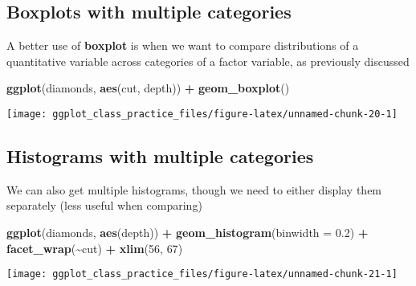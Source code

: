 \documentclass[
]{article}
\newenvironment{Shaded}{\begin{snugshade}}{\end{snugshade}}
\newcommand{\AttributeTok}[1]{\textcolor[rgb]{0.13,0.29,0.53}{#1}}
\newcommand{\DecValTok}[1]{\textcolor[rgb]{0.00,0.00,0.81}{#1}}
\newcommand{\FloatTok}[1]{\textcolor[rgb]{0.00,0.00,0.81}{#1}}
\newcommand{\FunctionTok}[1]{\textcolor[rgb]{0.13,0.29,0.53}{\textbf{#1}}}
\newcommand{\NormalTok}[1]{#1}
\newcommand{\SpecialCharTok}[1]{\textcolor[rgb]{0.81,0.36,0.00}{\textbf{#1}}}
\begin{document}
\hypertarget{boxplots-with-multiple-categories}{%
\subsection{Boxplots with multiple
categories}\label{boxplots-with-multiple-categories}}

A better use of \textbf{boxplot} is when we want to compare
distributions of a quantitative variable across categories of a factor
variable, as previously discussed

\begin{Shaded}
\begin{Highlighting}[]
\FunctionTok{ggplot}\NormalTok{(diamonds, }\FunctionTok{aes}\NormalTok{(cut, depth)) }\SpecialCharTok{+} \FunctionTok{geom\_boxplot}\NormalTok{()}
\end{Highlighting}
\end{Shaded}

\begin{center}\texttt{[image: ggplot\_class\_practice\_files/figure-latex/unnamed-chunk-20-1]} \end{center}

\hypertarget{histograms-with-multiple-categories}{%
\subsection{Histograms with multiple
categories}\label{histograms-with-multiple-categories}}

We can also get multiple histograms, though we need to either display
them separately (less useful when comparing)

\begin{Shaded}
\begin{Highlighting}[]
\FunctionTok{ggplot}\NormalTok{(diamonds, }\FunctionTok{aes}\NormalTok{(depth)) }\SpecialCharTok{+} \FunctionTok{geom\_histogram}\NormalTok{(}\AttributeTok{binwidth =} \FloatTok{0.2}\NormalTok{) }\SpecialCharTok{+} 
    \FunctionTok{facet\_wrap}\NormalTok{(}\SpecialCharTok{\textasciitilde{}}\NormalTok{cut) }\SpecialCharTok{+} \FunctionTok{xlim}\NormalTok{(}\DecValTok{56}\NormalTok{, }\DecValTok{67}\NormalTok{)}
\end{Highlighting}
\end{Shaded}

\begin{center}\texttt{[image: ggplot\_class\_practice\_files/figure-latex/unnamed-chunk-21-1]} \end{center}
\end{document}
